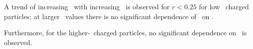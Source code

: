   A trend of increasing \RDptr\ with increasing \ptjet\ is observed for $r < 0.25$ for low 
\pt\ charged particles; at larger \rvar\ values there is no significant dependence of \RDptr\ on \ptjet.

Furthermore, for the higher-\pt\ charged particles, no significant dependence on \ptjet\ is observed.



\begin{figure}
\end{figure}

